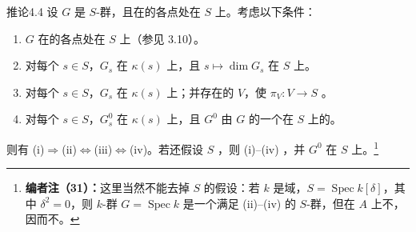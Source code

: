 \begin{SGAresult}{推论}{4.4}
设 $G$ 是 $S$-群，且在的各点处在 $S$ 上。考虑以下条件：
\begin{enumerate}
\item[(i)] $G$ 在的各点处在 $S$ 上（参见 3.10）。
\item[(ii)] 对每个 $s\in S$，$G_s$ 在 $\kappa(s)$ 上，且 $s\mapsto\dim G_s$ 在 $S$ 上。
\item[(iii)] 对每个 $s\in S$，$G_s$ 在 $\kappa(s)$ 上；并存在的 $V$，使 $\pi_V:V\to S$ 。
\item[(iv)] 对每个 $s\in S$，$G_s^0$ 在 $\kappa(s)$ 上，且 $G^0$ 由 $G$ 的一个在 $S$ 上的。
\end{enumerate}
则有 (i)$\Rightarrow$(ii)$\Leftrightarrow$(iii)$\Leftrightarrow$(iv)。若还假设 $S$ ，则 (i)--(iv) ，并 $G^0$ 在 $S$ 上。\footnote{\textbf{编者注（31）：}这里当然不能去掉 $S$ 的假设：若 $k$ 是域，$S=\operatorname{Spec}k[\delta]$，其中 $\delta^2=0$，则 $k$-群 $G=\operatorname{Spec}k$ 是一个满足 (ii)--(iv) 的 $S$-群，但在 $A$ 上不，因而不。}
\end{SGAresult}
